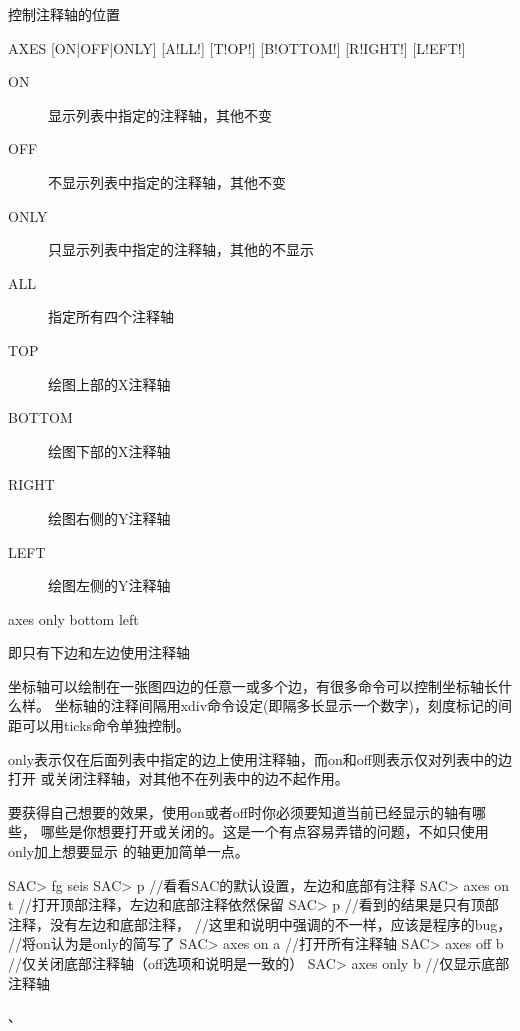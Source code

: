 \label{cmd:axes}

控制注释轴的位置

\begin{SACSTX}
AXES [ON|OFF|ONLY] [A!LL!] [T!OP!] [B!OTTOM!] [R!IGHT!] [L!EFT!]
\end{SACSTX}

\begin{description}
\item [ON] 显示列表中指定的注释轴，其他不变
\item [OFF] 不显示列表中指定的注释轴，其他不变
\item [ONLY] 只显示列表中指定的注释轴，其他的不显示
\item [ALL] 指定所有四个注释轴
\item [TOP] 绘图上部的X注释轴
\item [BOTTOM] 绘图下部的X注释轴
\item [RIGHT] 绘图右侧的Y注释轴
\item [LEFT] 绘图左侧的Y注释轴
\end{description}

\begin{SACDFT}
axes only bottom left
\end{SACDFT}
即只有下边和左边使用注释轴

坐标轴可以绘制在一张图四边的任意一或多个边，有很多命令可以控制坐标轴长什么样。
坐标轴的注释间隔用xdiv命令设定(即隔多长显示一个数字)，刻度标记的间距可以用ticks命令单独控制。

only表示仅在后面列表中指定的边上使用注释轴，而on和off则表示仅对列表中的边打开
或关闭注释轴，对其他不在列表中的边不起作用。

要获得自己想要的效果，使用on或者off时你必须要知道当前已经显示的轴有哪些，
哪些是你想要打开或关闭的。这是一个有点容易弄错的问题，不如只使用only加上想要显示
的轴更加简单一点。

\begin{SACCode}
SAC> fg seis
SAC> p           //看看SAC的默认设置，左边和底部有注释
SAC> axes on t   //打开顶部注释，左边和底部注释依然保留
SAC> p           //看到的结果是只有顶部注释，没有左边和底部注释，
                 //这里和说明中强调的不一样，应该是程序的bug，
                 //将on认为是only的简写了
SAC> axes on a   //打开所有注释轴
SAC> axes off b  //仅关闭底部注释轴（off选项和说明是一致的）
SAC> axes only b //仅显示底部注释轴
\end{SACCode}

、
